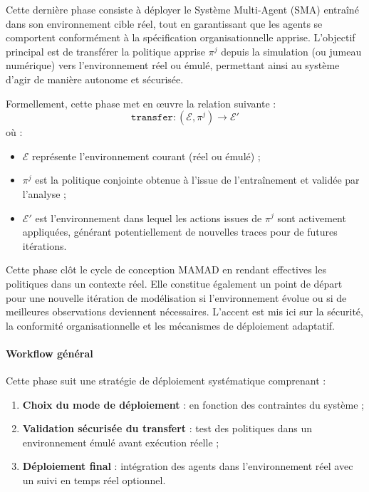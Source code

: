Cette dernière phase consiste à déployer le Système Multi-Agent (SMA) entraîné dans son environnement cible réel, tout en garantissant que les agents se comportent conformément à la spécification organisationnelle apprise. L'objectif principal est de transférer la politique apprise $\pi^j$ depuis la simulation (ou jumeau numérique) vers l'environnement réel ou émulé, permettant ainsi au système d'agir de manière autonome et sécurisée.

Formellement, cette phase met en œuvre la relation suivante :
\[
    \texttt{transfer}: \left( \mathcal{E}, \pi^j \right) \longrightarrow \mathcal{E}'
\]
où :
\begin{itemize}
    \item $\mathcal{E}$ représente l'environnement courant (réel ou émulé) ;
    \item $\pi^j$ est la politique conjointe obtenue à l'issue de l'entraînement et validée par l'analyse ;
    \item $\mathcal{E}'$ est l'environnement dans lequel les actions issues de $\pi^j$ sont activement appliquées, générant potentiellement de nouvelles traces pour de futures itérations.
\end{itemize}

Cette phase clôt le cycle de conception MAMAD en rendant effectives les politiques dans un contexte réel. Elle constitue également un point de départ pour une nouvelle itération de modélisation si l'environnement évolue ou si de meilleures observations deviennent nécessaires. L'accent est mis ici sur la sécurité, la conformité organisationnelle et les mécanismes de déploiement adaptatif.

\paragraph{Workflow général}

Cette phase suit une stratégie de déploiement systématique comprenant :
\begin{enumerate}
    \item \textbf{Choix du mode de déploiement} : en fonction des contraintes du système ;
    \item \textbf{Validation sécurisée du transfert} : test des politiques dans un environnement émulé avant exécution réelle ;
    \item \textbf{Déploiement final} : intégration des agents dans l'environnement réel avec un suivi en temps réel optionnel.
\end{enumerate}

